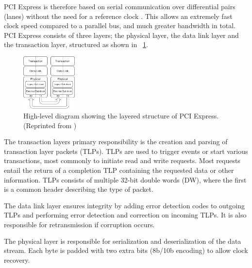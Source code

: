 PCI Express is therefore based on serial communication over differential pairs (lanes\footnotemark) without the need for a reference clock \cite{pcie}.
This allows an extremely fast clock speed compared to a parallel bus, and much greater bandwidth in total.
PCI Express consists of three layers; the physical layer, the data link layer and the transaction layer, structured as shown in \figurename~\ref{fig:pcie}.

\begin{figure}[!ht]
    \centering
    \includegraphics[width=0.25\textwidth]{figures/pcie}
    \caption{High-level diagram showing the layered structure of PCI Express. (Reprinted from \cite{pcie})}
    \label{fig:pcie}
\end{figure}

The transaction layers primary responsibility is the creation and parsing of transaction layer packets (TLPs).
TLPs are used to trigger events or start various transactions, most commonly to initiate read and write requests\footnotemark.
Most requests entail the return of a completion TLP containing the requested data or other information.
TLPs consists of multiple 32-bit double words (DW), where the first is a common header describing the type of packet.

The data link layer ensures integrity by adding error detection codes to outgoing TLPs and performing error detection and correction on incoming TLPs.
It is also responsible for retransmission if corruption occurs.

The physical layer is responsible for serialization and deserialization of the data stream.
Each byte is padded with two extra bits (8b/10b encoding) to allow clock recovery.

